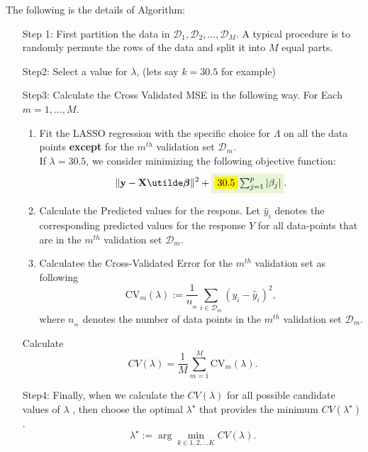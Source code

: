 \documentclass[12pt]{article}
\begin{document}
\begin{enumerate}
\begin{enumerate}
The following is the details of Algorithm: 

\begin{enumerate}
\item[Step 1:] First partition the data in  $\mathcal{D}_1, \mathcal{D}_2, \ldots,  \mathcal{D}_M$. A typical procedure is to randomly permute the rows of the data and split it into $M$ equal parts. 
\item[Step2: ]  Select a value for $\lambda$, (lets say $k=30.5$ for example) 
\item[Step3: ] Calculate the Cross Validated MSE in the following way.  For Each $m=1, \ldots , M$. 
\begin{enumerate}
\item Fit the LASSO regression with the specific choice for $\Lambda$ on all the data points {\bf except} for the $m^{th}$ validation set $\mathcal{D}_{m}$.  \\
If $\lambda=30.5$, we consider minimizing the following objective function: 
$$ \Vert{\bf y}-\bX\bbeta\Vert^2+\HLTEQ{\HLTY{30.5}\sum_{j=1}^{p}\vert \beta_j \vert}.$$

\item Calculate the Predicted values for the respons. Let $\widehat{y}_i$ denotes the corresponding predicted values for the response $Y$ for all data-points that are in the $m^{th}$ validation set $\mathcal{D}_m$.

\item Calculatee the Cross-Validated Error for the $m^{th}$ validation set as following 
$$\text{CV}_{m}(\lambda):=\frac{1}{n_{_{m }}} \sum_{i\in \mathcal{D}_{m}} \left( y_i -\widehat{y}_i\right)^2,   $$
where $n_{_m}$ denotes the number of data points in the $m^{th}$ validation set $\mathcal{D}_m$.
\end{enumerate}
Calculate $$  CV(\lambda)=\frac{1}{M} \sum_{m=1}^M \text{CV}_{m}(\lambda).$$

\item[Step4:] Finally, when we calculate the   $CV(\lambda)$ for all possible candidate values of $\lambda$ ,  then choose the optimal  $\lambda^{\star}$ that provides the minimum $CV(\lambda^{\star})$. 
 $$\lambda^{\star}:= \arg \min_{k\in 1, 2, \ldots K}  CV(\lambda).$$


\end{enumerate}





\end{enumerate}

\newpage




\end{enumerate}
\end{document}
